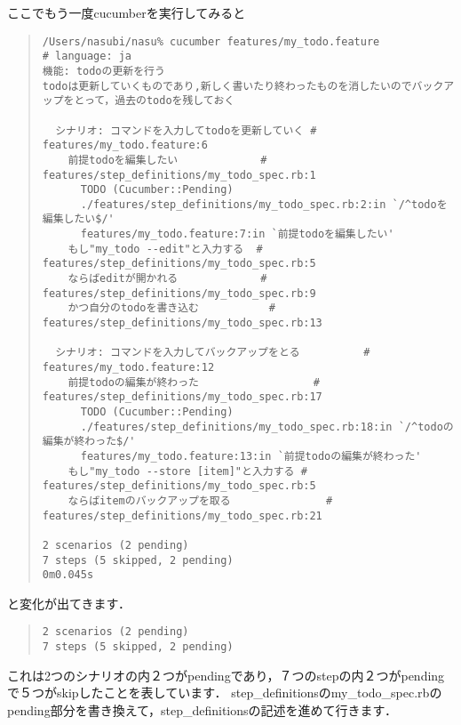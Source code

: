 ここでもう一度cucumberを実行してみると
\begin{quote}\begin{verbatim}
/Users/nasubi/nasu% cucumber features/my_todo.feature 
# language: ja
機能: todoの更新を行う
todoは更新していくものであり,新しく書いたり終わったものを消したいのでバックアップをとって，過去のtodoを残しておく

  シナリオ: コマンドを入力してtodoを更新していく # features/my_todo.feature:6
    前提todoを編集したい             # features/step_definitions/my_todo_spec.rb:1
      TODO (Cucumber::Pending)
      ./features/step_definitions/my_todo_spec.rb:2:in `/^todoを編集したい$/'
      features/my_todo.feature:7:in `前提todoを編集したい'
    もし"my_todo --edit"と入力する  # features/step_definitions/my_todo_spec.rb:5
    ならばeditが開かれる             # features/step_definitions/my_todo_spec.rb:9
    かつ自分のtodoを書き込む           # features/step_definitions/my_todo_spec.rb:13

  シナリオ: コマンドを入力してバックアップをとる          # features/my_todo.feature:12
    前提todoの編集が終わった                  # features/step_definitions/my_todo_spec.rb:17
      TODO (Cucumber::Pending)
      ./features/step_definitions/my_todo_spec.rb:18:in `/^todoの編集が終わった$/'
      features/my_todo.feature:13:in `前提todoの編集が終わった'
    もし"my_todo --store [item]"と入力する # features/step_definitions/my_todo_spec.rb:5
    ならばitemのバックアップを取る               # features/step_definitions/my_todo_spec.rb:21

2 scenarios (2 pending)
7 steps (5 skipped, 2 pending)
0m0.045s

\end{verbatim}\end{quote}
と変化が出てきます．
\begin{quote}\begin{verbatim}
2 scenarios (2 pending)
7 steps (5 skipped, 2 pending)
\end{verbatim}\end{quote}
これは2つのシナリオの内２つがpendingであり，７つのstepの内２つがpendingで５つがskipしたことを表しています．
step\_definitionsのmy\_todo\_spec.rbのpending部分を書き換えて，step\_definitionsの記述を進めて行きます．

